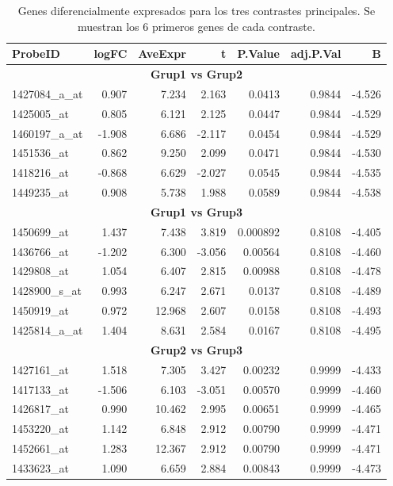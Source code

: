 \documentclass[12pt,a4paper]{article}
\begin{document}
\begin{table}[ht]
\centering
\caption{Genes diferencialmente expresados para los tres contrastes principales. Se muestran los 6 primeros genes de cada contraste.}
\begin{tabular}{lrrrrrr}
\hline
\textbf{ProbeID} & \textbf{logFC} & \textbf{AveExpr} & \textbf{t} & \textbf{P.Value} & \textbf{adj.P.Val} & \textbf{B} \\
\hline
\multicolumn{7}{c}{\textbf{Grup1 vs Grup2}} \\
1427084\_a\_at & 0.907 & 7.234 & 2.163 & 0.0413 & 0.9844 & -4.526 \\
1425005\_at & 0.805 & 6.121 & 2.125 & 0.0447 & 0.9844 & -4.529 \\
1460197\_a\_at & -1.908 & 6.686 & -2.117 & 0.0454 & 0.9844 & -4.529 \\
1451536\_at & 0.862 & 9.250 & 2.099 & 0.0471 & 0.9844 & -4.530 \\
1418216\_at & -0.868 & 6.629 & -2.027 & 0.0545 & 0.9844 & -4.535 \\
1449235\_at & 0.908 & 5.738 & 1.988 & 0.0589 & 0.9844 & -4.538 \\
\hline
\multicolumn{7}{c}{\textbf{Grup1 vs Grup3}} \\
1450699\_at & 1.437 & 7.438 & 3.819 & 0.000892 & 0.8108 & -4.405 \\
1436766\_at & -1.202 & 6.300 & -3.056 & 0.00564 & 0.8108 & -4.460 \\
1429808\_at & 1.054 & 6.407 & 2.815 & 0.00988 & 0.8108 & -4.478 \\
1428900\_s\_at & 0.993 & 6.247 & 2.671 & 0.0137 & 0.8108 & -4.489 \\
1450919\_at & 0.972 & 12.968 & 2.607 & 0.0158 & 0.8108 & -4.493 \\
1425814\_a\_at & 1.404 & 8.631 & 2.584 & 0.0167 & 0.8108 & -4.495 \\
\hline
\multicolumn{7}{c}{\textbf{Grup2 vs Grup3}} \\
1427161\_at & 1.518 & 7.305 & 3.427 & 0.00232 & 0.9999 & -4.433 \\
1417133\_at & -1.506 & 6.103 & -3.051 & 0.00570 & 0.9999 & -4.460 \\
1426817\_at & 0.990 & 10.462 & 2.995 & 0.00651 & 0.9999 & -4.465 \\
1453220\_at & 1.142 & 6.848 & 2.912 & 0.00790 & 0.9999 & -4.471 \\
1452661\_at & 1.283 & 12.367 & 2.912 & 0.00790 & 0.9999 & -4.471 \\
1433623\_at & 1.090 & 6.659 & 2.884 & 0.00843 & 0.9999 & -4.473 \\
\hline
\end{tabular}
\end{table}
\end{document}
